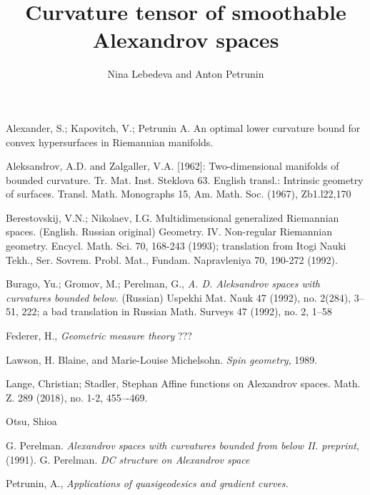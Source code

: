\documentclass[a4paper,10pt]{article}
\begin{document}
\title{Curvature tensor of smoothable Alexandrov spaces}
\author{Nina Lebedeva and Anton Petrunin}
\maketitle









\begin{thebibliography}{52}

 Alexander, S.; Kapovitch, V.; Petrunin A.
An optimal lower curvature bound for convex hypersurfaces in Riemannian manifolds.


Aleksandrov, A.D. and Zalgaller, V.A. [1962]: Two-dimensional manifolds of bounded curvature.
Tr. Mat. Inst. Steklova 63. English transl.: Intrinsic geometry of surfaces. Transl. Math. Monographs
15, Am. Math. Soc. (1967), Zb1.l22,170


Berestovskij, V.N.; Nikolaev, I.G.
Multidimensional generalized Riemannian spaces. (English. Russian original)
Geometry. IV. Non-regular Riemannian geometry. Encycl. Math. Sci. 70, 168-243 (1993); translation from Itogi Nauki Tekh., Ser. Sovrem. Probl. Mat., Fundam. Napravleniya 70, 190-272 (1992).


 Burago, Yu.; Gromov, M.; Perelman, G., \textit{A. D. Aleksandrov spaces
with curvatures bounded below.} (Russian)  Uspekhi Mat. Nauk  47  (1992),  no.
2(284), 3--51, 222;  a bad translation in  Russian Math. Surveys  47  (1992),  no. 2, 1--58

Federer, H., \textit{Geometric measure theory} ???

 Lawson, H. Blaine, and Marie-Louise Michelsohn. \emph{Spin geometry}, 1989.

 Lange, Christian; Stadler, Stephan
Affine functions on Alexandrov spaces. 
Math. Z. 289 (2018), no. 1-2, 455–-469. 

Otsu, Shioa

 G. Perelman. \textit{Alexandrov spaces with curvatures bounded from below II. preprint}, (1991).
 G. Perelman. \textit{DC structure on Alexandrov space}

 Petrunin, A., \textit{Applications of quasigeodesics
and gradient curves.}


\end{thebibliography}
\end{document}
